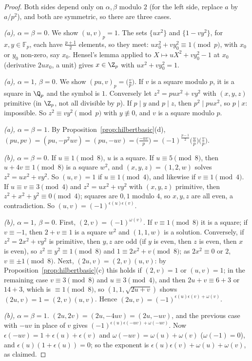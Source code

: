 \begin{proof}
Both sides depend only on $\alpha,\beta$ modulo $2$ (for the left side, replace $a$ by $a/p^2$), and both are symmetric, so
there are three cases.

\emph{(a), $\alpha=\beta=0$.} We show $(u,v)_p=1$. The sets $\{ux^2\}$ and $\{1-vy^2\}$, for $x,y\in\mathbb F_p$, each have
$\frac{p+1}2$ elements, so they meet: $ux_0^2+vy_0^2\equiv1\pmod p$, with $x_0$ or $y_0$ non-zero, say $x_0$. Hensel's lemma
applied to $X\mapsto uX^2+vy_0^2-1$ at $x_0$ (derivative $2ux_0$, a unit) gives $x\in\Z_p$ with $ux^2+vy_0^2=1$.

\emph{(a), $\alpha=1$, $\beta=0$.} We show $(pu,v)_p=\bigl(\frac vp\bigr)$. If $v$ is a square modulo $p$, it is a square in
$\Q_p$ and the symbol is $1$. Conversely let $z^2=pux^2+vy^2$ with $(x,y,z)$ primitive (in $\Z_p$, not all divisible by $p$).
If $p\mid y$ and $p\mid z$, then $p^2\mid pux^2$, so $p\mid x$: impossible. So $z^2\equiv vy^2\pmod p$ with $y\not\equiv0$, and
$v$ is a square modulo $p$.

\emph{(a), $\alpha=\beta=1$.} By Proposition~\ref{prop:hilbertbasic}(d), $(pu,pv)=(pu,-p^2uv)=(pu,-uv)=\bigl(\frac{-uv}p\bigr)=
(-1)^{\frac{p-1}2}\bigl(\frac up\bigr)\bigl(\frac vp\bigr)$.

\emph{(b), $\alpha=\beta=0$.} If $u\equiv1\pmod8$, $u$ is a square. If $u\equiv5\pmod8$, then $u+4v\equiv1\pmod8$ is a square
$w^2$, and $(x,y,z)=(1,2,w)$ solves $z^2=ux^2+vy^2$. So $(u,v)=1$ if $u\equiv1\pmod4$, and likewise if $v\equiv1\pmod4$.
If $u\equiv v\equiv3\pmod4$ and $z^2=ux^2+vy^2$ with $(x,y,z)$ primitive, then $z^2+x^2+y^2\equiv0\pmod4$; squares are
$0,1$ modulo $4$, so $x,y,z$ are all even, a contradiction. So $(u,v)=(-1)^{\epsilon(u)\epsilon(v)}$.

\emph{(b), $\alpha=1$, $\beta=0$.} First, $(2,v)=(-1)^{\omega(v)}$. If $v\equiv1\pmod 8$ it is a square; if $v\equiv-1$, then
$2+v\equiv1$ is a square $w^2$ and $(1,1,w)$ is a solution. Conversely, if $z^2=2x^2+vy^2$ is primitive, then $y,z$ are odd
(if $y$ is even, then $z$ is even, then $x$ is even), so $z^2\equiv y^2\equiv1\pmod8$ and $1\equiv2x^2+v\pmod 8$; as $2x^2\equiv
0$ or $2$, $v\equiv\pm1\pmod8$. Next, $(2u,v)=(2,v)(u,v)$: by Proposition~\ref{prop:hilbertbasic}(c) this holds if $(2,v)=1$ or
$(u,v)=1$; in the remaining case $v\equiv3\pmod8$ and $u\equiv3\pmod4$, and then $2u+v\equiv6+3$ or $14+3$, which is
$\equiv1\pmod 8$, so $(1,1,\sqrt{2u+v})$ shows $(2u,v)=1=(2,v)(u,v)$. Hence $(2u,v)=(-1)^{\epsilon(u)\epsilon(v)+\omega(v)}$.

\emph{(b), $\alpha=\beta=1$.} $(2u,2v)=(2u,-4uv)=(2u,-uv)$, and the previous case with $-uv$ in place of $v$ gives
$(-1)^{\epsilon(u)\epsilon(-uv)+\omega(-uv)}$. Now $\epsilon(-uv)=1+\epsilon(u)+\epsilon(v)$ and $\omega(-uv)=\omega(u)+\omega(v)$
($\omega(-1)=0$), and $\epsilon(u)(1+\epsilon(u))=0$; so the exponent is $\epsilon(u)\epsilon(v)+\omega(u)+\omega(v)$, as claimed.
\end{proof}

